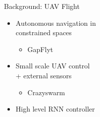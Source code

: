 \documentclass[xcolor=x11names,compress]{beamer}
\begin{document}
\begin{frame}{Background: UAV Flight}
	\vspace{-40pt}
	\begin{itemize}
		\item Autonomous navigation in \\constrained spaces 
		\begin{itemize}
			\item GapFlyt 
		\end{itemize}
		\item Small scale UAV control\\ + external sensors
		\begin{itemize}
			\item Crazyswarm
		\end{itemize}
		\item High level RNN controller
        

\end{itemize}
\end{frame}
\end{document}
